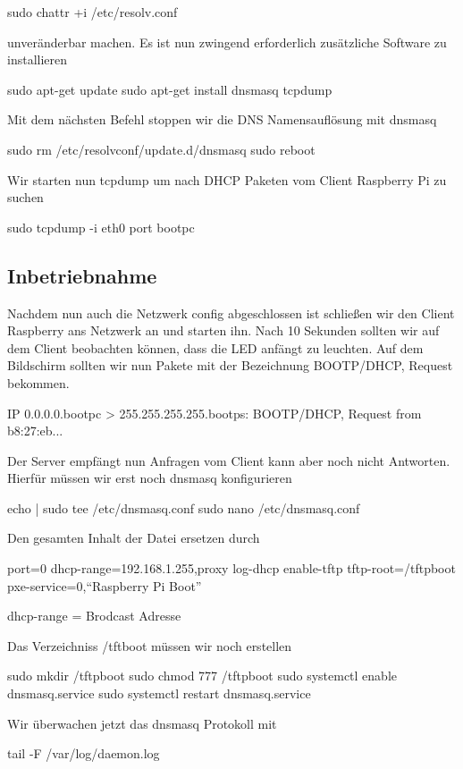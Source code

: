 \documentclass [a4paper,10pt] {article}
\begin{document}
			sudo chattr +i /etc/resolv.conf
			
			unveränderbar machen. Es ist nun zwingend erforderlich zusätzliche Software zu installieren 
			
			sudo apt-get update
			sudo apt-get install dnsmasq tcpdump
			
			Mit dem nächsten Befehl stoppen wir die DNS Namensauflösung mit dnsmasq 
			
			sudo rm /etc/resolvconf/update.d/dnsmasq
			sudo reboot
			
			Wir starten nun tcpdump um nach DHCP Paketen vom Client Raspberry Pi zu suchen
			
			sudo tcpdump -i eth0 port bootpc
						
		\vfill
		
		\subsection{Inbetriebnahme}
			
			Nachdem nun auch die Netzwerk config abgeschlossen ist schließen wir den Client Raspberry ans Netzwerk an und starten ihn. Nach 10 Sekunden sollten wir auf dem Client beobachten können, dass die LED anfängt zu leuchten. Auf dem Bildschirm sollten wir nun Pakete mit der Bezeichnung BOOTP/DHCP, Request bekommen.
			
			IP 0.0.0.0.bootpc > 255.255.255.255.bootps: BOOTP/DHCP, Request from b8:27:eb...
		
			Der Server empfängt nun Anfragen vom Client kann aber noch nicht Antworten. Hierfür müssen wir erst noch dnsmasq konfigurieren
			
			echo | sudo tee /etc/dnsmasq.conf
			sudo nano /etc/dnsmasq.conf
			
			Den gesamten Inhalt der Datei ersetzen durch
			
			port=0
			dhcp-range=192.168.1.255,proxy
			log-dhcp
			enable-tftp
			tftp-root=/tftpboot
			pxe-service=0,``Raspberry Pi Boot''
			
			dhcp-range = Brodcast Adresse
			
			Das Verzeichniss /tftboot müssen wir noch erstellen
			
			sudo mkdir /tftpboot
			sudo chmod 777 /tftpboot
			sudo systemctl enable dnsmasq.service
			sudo systemctl restart dnsmasq.service
			
			Wir überwachen jetzt das dnsmasq Protokoll mit 
			
			tail -F /var/log/daemon.log
			
\end{document}
